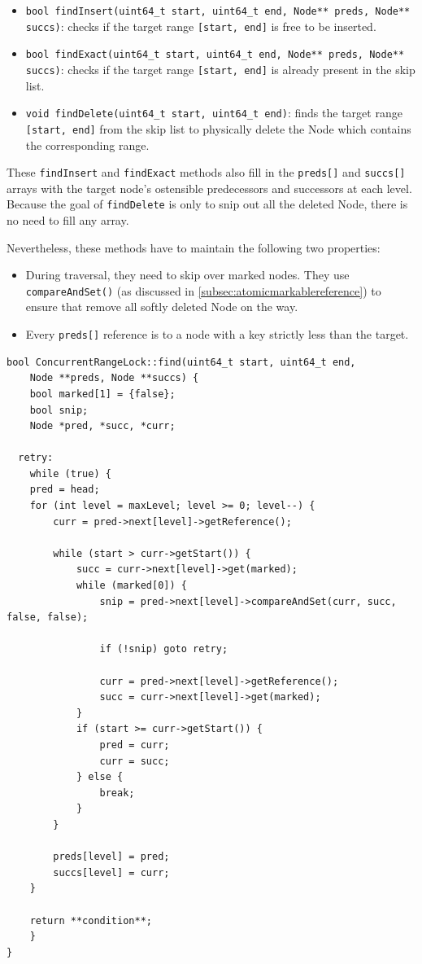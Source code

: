 \begin{itemize}
    \item \texttt{bool findInsert(uint64\_t start, uint64\_t end, Node** preds, Node** succs)}: checks if the target range \texttt{[start, end]} is free to be inserted.
    
    \item \texttt{bool findExact(uint64\_t start, uint64\_t end, Node** preds, Node** succs)}: checks if the target range \texttt{[start, end]} is already present in the skip list.
    
    \item \texttt{void findDelete(uint64\_t start, uint64\_t end)}: finds the target range \texttt{[start, end]} from the skip list to physically delete the Node which contains the corresponding range.
\end{itemize}

These \texttt{findInsert} and \texttt{findExact} methods also fill in the \texttt{preds[]} and \texttt{succs[]} arrays with the target node's ostensible predecessors and successors at each level.
Because the goal of \texttt{findDelete} is only to snip out all the deleted Node, there is no need to fill any array.

Nevertheless, these methods have to maintain the following two properties:

\begin{itemize}
    \item During traversal, they need to skip over marked nodes.
    They use \texttt{compareAndSet()} (as discussed in \ref{subsec:atomicmarkablereference}) to ensure that remove all softly deleted Node on the way.
    \item Every \texttt{preds[]} reference is to a node with a key strictly less than the target.
\end{itemize}

\begin{lstlisting}[style=mystyle, caption=Find method implementation,label={}]
bool ConcurrentRangeLock::find(uint64_t start, uint64_t end,
    Node **preds, Node **succs) {
    bool marked[1] = {false};
    bool snip;
    Node *pred, *succ, *curr;

  retry:
    while (true) {
    pred = head;
    for (int level = maxLevel; level >= 0; level--) {
        curr = pred->next[level]->getReference();

        while (start > curr->getStart()) {
            succ = curr->next[level]->get(marked);
            while (marked[0]) {
                snip = pred->next[level]->compareAndSet(curr, succ, false, false);

                if (!snip) goto retry;

                curr = pred->next[level]->getReference();
                succ = curr->next[level]->get(marked);
            }
            if (start >= curr->getStart()) {
                pred = curr;
                curr = succ;
            } else {
                break;
            }
        }

        preds[level] = pred;
        succs[level] = curr;
    }
        
    return **condition**;
    }
}
\end{lstlisting}

